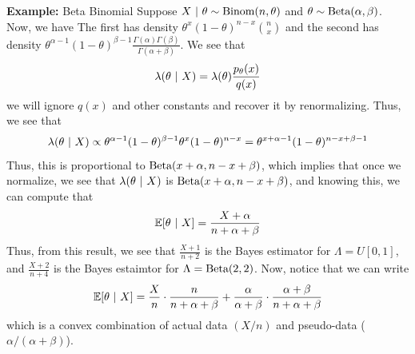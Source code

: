\begin{example}{\textbf{Example:} Beta Binomial}
    Suppose $X \given \theta \sim \Binom(n, \theta)$ and $\theta \sim \tt{Beta}(\alpha, \beta)$. Now, we have
    The first has density $\theta^{x}(1 - \theta)^{n - x}{n \choose x}$ and the second has density $\theta^{\alpha - 1}(1 - \theta)^{\beta - 1}\frac{\Gamma(\alpha)\Gamma(\beta)}{\Gamma(\alpha + \beta)}$. We see that
    \[ \lambda(\theta \given X) = \lambda(\theta)\frac{p_{\theta}(x)}{q(x)} \]
    we will ignore $q(x)$ and other constants and recover it by renormalizing. Thus, we see that
    \[ \lambda(\theta \given X) \propto \theta^{\alpha - 1}(1 - \theta)^{\beta - 1}\theta^{x}(1 - \theta)^{n - x} = \theta^{x + \alpha - 1}(1 - \theta)^{n - x + \beta - 1}\]
    Thus, this is proportional to $\tt{Beta}(x + \alpha, n - x + \beta)$, which implies that once we normalize, we see that $\lambda(\theta \given X)$ is $\tt{Beta}(x + \alpha, n - x + \beta)$, and knowing this, we can compute that
    \[ \bb{E}[\theta \given X] = \frac{X + \alpha}{n + \alpha + \beta} \]
    Thus, from this result, we see that $\frac{X + 1}{n + 2}$ is the Bayes estimator for $\Lambda = U[0, 1]$, and $\frac{X + 2}{n + 4}$ is the Bayes estaimtor for $\Lambda = \tt{Beta}(2, 2)$. Now, notice that we can write
    \[ \bb{E}[{\theta \given X}] = \frac{X}{n} \cdot \frac{n}{n + \alpha + \beta} + \frac{\alpha}{\alpha + \beta} \cdot \frac{\alpha + \beta}{n + \alpha + \beta} \]
    which is a convex combination of actual data $(X/n)$ and pseudo-data ($\alpha/(\alpha + \beta)$). 
\end{example}